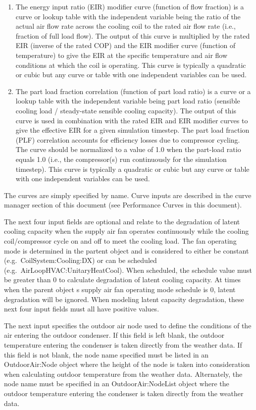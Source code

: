 \begin{enumerate}
\item
  The energy input ratio (EIR) modifier curve (function of flow fraction) is a curve or lookup table with the independent variable being the ratio of the actual air flow rate across the cooling coil to the rated air flow rate (i.e., fraction of full load flow). The output of this curve is multiplied by the rated EIR (inverse of the rated COP) and the EIR modifier curve (function of temperature) to give the EIR at the specific temperature and air flow conditions at which the coil is operating. This curve is typically a quadratic or cubic but any curve or table with one independent variables can be used.
\item
  The part load fraction correlation (function of part load ratio) is a curve or a lookup table with the independent variable being part load ratio (sensible cooling load / steady-state sensible cooling capacity). The output of this curve is used in combination with the rated EIR and EIR modifier curves to give the effective EIR for a given simulation timestep. The part load fraction (PLF) correlation accounts for efficiency losses due to compressor cycling. The curve should be normalized to a value of 1.0 when the part-load ratio equals 1.0 (i.e., the compressor(s) run continuously for the simulation timestep). This curve is typically a quadratic or cubic but any curve or table with one independent variables can be used.
\end{enumerate}

The curves are simply specified by name. Curve inputs are described in the curve manager section of this document (see Performance Curves in this document).

The next four input fields are optional and relate to the degradation of latent cooling capacity when the supply air fan operates continuously while the cooling coil/compressor cycle on and off to meet the cooling load. The fan operating mode is determined in the partent object and is considered to either be constant (e.g.~CoilSystem:Cooling:DX) or can be scheduled (e.g.~AirLoopHVAC:UnitaryHeatCool). When scheduled, the schedule value must be greater than 0 to calculate degradation of latent cooling capacity. At times when the parent object s supply air fan operating mode schedule is 0, latent degradation will be ignored. When modeling latent capacity degradation, these next four input fields must all have positive values.

The next input specifies the outdoor air node used to define the conditions of the air entering the outdoor condenser. If this field is left blank, the outdoor temperature entering the condenser is taken directly from the weather data. If this field is not blank, the node name specified must be listed in an OutdoorAir:Node object where the height of the node is taken into consideration when calculating outdoor temperature from the weather data. Alternately, the node name must be specified in an OutdoorAir:NodeList object where the outdoor temperature entering the condenser is taken directly from the weather data.

